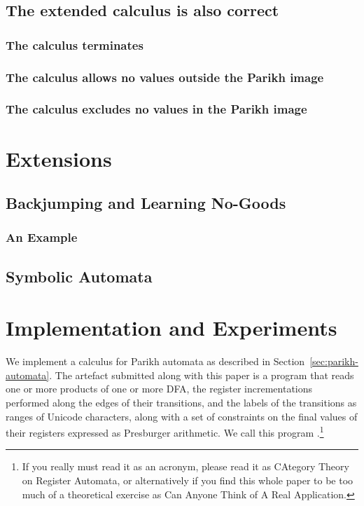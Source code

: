 \documentclass[acmsmall,review,anonymous]{acmart}\settopmatter{printfolios=true,printccs=false,printacmref=true}
\theoremstyle{definition}
\begin{document}
\subsection{The extended calculus is also correct}
\subsubsection{The calculus terminates}
\subsubsection{The calculus allows no values outside the Parikh image}
\subsubsection{The calculus excludes no values in the Parikh image}


\section{Extensions}
\subsection{Backjumping and Learning No-Goods}
\subsubsection{An Example}
\subsection{Symbolic Automata}\label{sec:ext:symbolic}


\section{Implementation and Experiments}\label{sec:implementation}

We implement a calculus for Parikh automata as described in
Section~\ref{sec:parikh-automata}. The artefact submitted along with this paper
is a program that reads one or more products of one or more DFA, the
register incrementations performed along the edges of their transitions, and the
labels of the transitions as ranges of Unicode characters, along with a set of
constraints on the final values of their registers expressed as Presburger
arithmetic. We call this program \Catra{}.\footnote{If you really must read it
as an acronym, please read it as CAtegory Theory on Register Automata, or
alternatively if you find this whole paper to be too much of a theoretical
exercise as Can Anyone Think of A Real Application.}
\end{document}
